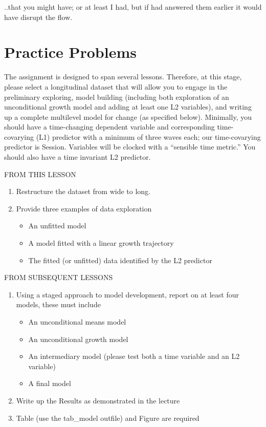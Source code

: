 \documentclass[
  english,
]{book}
\providecommand{\tightlist}{%
  \setlength{\itemsep}{0pt}\setlength{\parskip}{0pt}}
\begin{document}
..that you might have; or at least I had, but if had answered them earlier it would have disrupt the flow.

\hypertarget{practice-problems-1}{%
\section{Practice Problems}\label{practice-problems-1}}

The assignment is designed to span several lessons. Therefore, at this stage, please select a longitudinal dataset that will allow you to engage in the preliminary exploring, model building (including both exploration of an unconditional growth model and adding at least one L2 variables), and writing up a complete multilevel model for change (as specified below). Minimally, you should have a time-changing dependent variable and corresponding time-covarying (L1) predictor with a minimum of three waves each; our time-covarying predictor is Session. Variables will be clocked with a ``sensible time metric.'' You should also have a time invariant L2 predictor.

FROM THIS LESSON

\begin{enumerate}
\def\labelenumi{\arabic{enumi}.}
\tightlist
\item
  Restructure the dataset from wide to long.
\item
  Provide three examples of data exploration

  \begin{itemize}
  \tightlist
  \item
    An unfitted model
  \item
    A model fitted with a linear growth trajectory
  \item
    The fitted (or unfitted) data identified by the L2 predictor
  \end{itemize}
\end{enumerate}

FROM SUBSEQUENT LESSONS

\begin{enumerate}
\def\labelenumi{\arabic{enumi}.}
\setcounter{enumi}{2}
\tightlist
\item
  Using a staged approach to model development, report on at least four models, these must include

  \begin{itemize}
  \tightlist
  \item
    An unconditional means model
  \item
    An unconditional growth model
  \item
    An intermediary model (please test both a time variable and an L2 variable)
  \item
    A final model
  \end{itemize}
\item
  Write up the Results as demonstrated in the lecture
\item
  Table (use the tab\_model outfile) and Figure are required
\end{enumerate}
\end{document}

